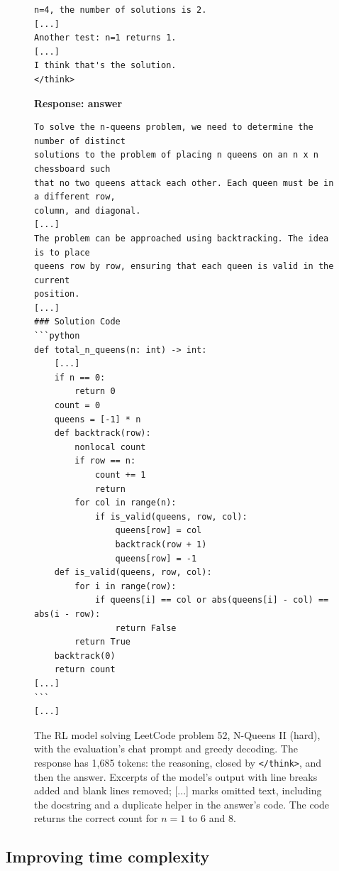 \documentclass[sigconf,nonacm,balance=false]{acmart}
\begin{document}
\begin{figure}
\begin{minipage}[t]{0.49\textwidth}
\begin{verbatim}
n=4, the number of solutions is 2.
[...]
Another test: n=1 returns 1.
[...]
I think that's the solution.
</think>
\end{verbatim}
  \end{minipage}\hfill
  \begin{minipage}[t]{0.49\textwidth}
    \scriptsize
    \textbf{Response: answer}\vspace{-0.5em}
\begin{verbatim}
To solve the n-queens problem, we need to determine the number of distinct
solutions to the problem of placing n queens on an n x n chessboard such
that no two queens attack each other. Each queen must be in a different row,
column, and diagonal.
[...]
The problem can be approached using backtracking. The idea is to place
queens row by row, ensuring that each queen is valid in the current
position.
[...]
### Solution Code
```python
def total_n_queens(n: int) -> int:
    [...]
    if n == 0:
        return 0
    count = 0
    queens = [-1] * n
    def backtrack(row):
        nonlocal count
        if row == n:
            count += 1
            return
        for col in range(n):
            if is_valid(queens, row, col):
                queens[row] = col
                backtrack(row + 1)
                queens[row] = -1
    def is_valid(queens, row, col):
        for i in range(row):
            if queens[i] == col or abs(queens[i] - col) == abs(i - row):
                return False
        return True
    backtrack(0)
    return count
[...]
```
[...]
\end{verbatim}
  \end{minipage}
  \caption{The RL model solving LeetCode problem 52, N-Queens II (hard), with the evaluation's chat prompt and greedy
  decoding. The response has 1,685 tokens: the reasoning, closed by \texttt{</think>}, and then the answer. Excerpts of
  the model's output with line breaks added and blank lines removed; [...] marks omitted text, including the docstring
  and a duplicate helper in the answer's code. The code returns the correct count for $n = 1$ to 6 and 8.}
  \label{fig:example}
\end{figure}

\subsection{Improving time complexity}
\end{document}

